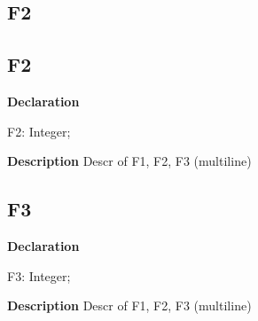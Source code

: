 \documentclass{report}
\newif\ifpdf
\begin{document}
\subsection*{\large{\textbf{F2}}\normalsize\hspace{1ex}\hrulefill}
\else
\subsection*{F2}
\fi
\label{ok_multiple_fields-F2}
\begin{list}{}{
\setlength{\itemindent}{0cm}
\setlength{\listparindent}{0cm}
\setlength{\leftmargin}{\evensidemargin}
\addtolength{\leftmargin}{\tmplength}
\settowidth{\labelsep}{X}
\addtolength{\leftmargin}{\labelsep}
\setlength{\labelwidth}{\tmplength}
}
\item[\textbf{Declaration}\hfill]
\ifpdf
\begin{flushleft}
\fi
\begin{ttfamily}
F2: Integer;\end{ttfamily}

\ifpdf
\end{flushleft}
\fi

\par
\item[\textbf{Description}]
Descr of F1, F2, F3 (multiline)

\end{list}
\ifpdf
\subsection*{\large{\textbf{F3}}\normalsize\hspace{1ex}\hrulefill}
\else
\subsection*{F3}
\fi
\label{ok_multiple_fields-F3}
\begin{list}{}{
\setlength{\itemindent}{0cm}
\setlength{\listparindent}{0cm}
\setlength{\leftmargin}{\evensidemargin}
\addtolength{\leftmargin}{\tmplength}
\settowidth{\labelsep}{X}
\addtolength{\leftmargin}{\labelsep}
\setlength{\labelwidth}{\tmplength}
}
\item[\textbf{Declaration}\hfill]
\ifpdf
\begin{flushleft}
\fi
\begin{ttfamily}
F3: Integer;\end{ttfamily}

\ifpdf
\end{flushleft}
\fi

\par
\item[\textbf{Description}]
Descr of F1, F2, F3 (multiline)

\end{list}
\ifpdf
\end{document}
